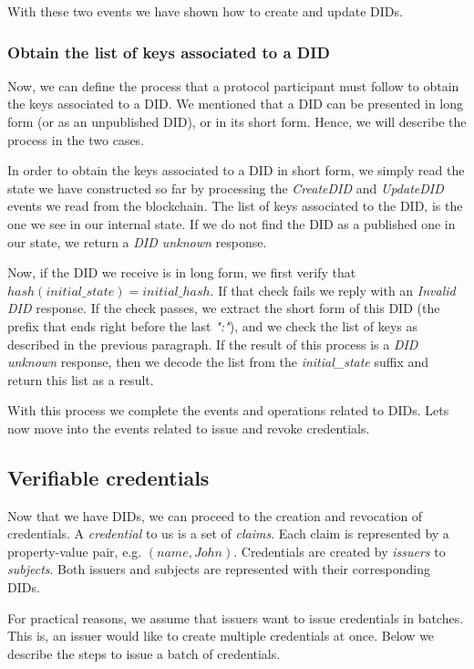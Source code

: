 \documentclass[10pt,a4paper]{article}
\begin{document}
With these two events we have shown how to create and update DIDs. 

\subsubsection{Obtain the list of keys associated to a DID}

Now, we can define the process that a protocol participant must follow to obtain the keys associated to a DID. 
We mentioned that a DID can be presented in long form (or as an unpublished DID), or in its short form. Hence, we will describe the process in the two cases.

In order to obtain the keys associated to a DID in short form, we simply read the state we have constructed so far by processing the \emph{CreateDID} and \emph{UpdateDID} events we read from the blockchain. The list of keys associated to the DID, is the one we see in our internal state. If we do not find the DID as a published one in our state, we return a \emph{DID unknown} response.

Now, if the DID we receive is in long form, we first verify that $hash(initial\_state) = initial\_hash$. If that check fails we reply with an \emph{Invalid DID} response. If the check passes, we extract the short form of this DID (the prefix that ends right before the last \emph{":"}), and we check the list of keys as described in the previous paragraph. If the result of this process is a \emph{DID unknown} response, then we decode the list from the \emph{initial\_state} suffix and return this list as a result.

With this process we complete the events and operations related to DIDs. 
Lets now move into the events related to issue and revoke credentials.

\subsection{Verifiable credentials}

Now that we have DIDs, we can proceed to the creation and revocation of credentials. A \emph{credential} to us is a set of \emph{claims}. Each claim is represented by a property-value pair, e.g. $(name, John)$. Credentials are created by \emph{issuers} to \emph{subjects}. Both issuers and subjects are represented with their corresponding DIDs. 

For practical reasons, we assume that issuers want to issue credentials in batches. This is, an issuer would like to create multiple credentials at once. Below we describe the steps to issue a batch of credentials.
\end{document}
